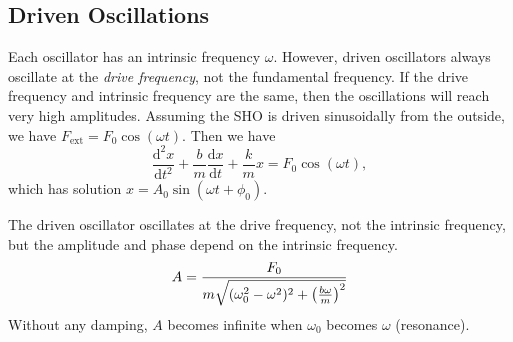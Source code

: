 \documentclass[class=article, crop=false]{standalone}
\begin{document}
  \subsection{Driven Oscillations}
  Each oscillator has an intrinsic frequency $\omega$. However, driven oscillators always oscillate at the \emph{drive frequency}, not the fundamental frequency. If the drive frequency and intrinsic frequency are the same, then the oscillations will reach very high amplitudes. Assuming the SHO is driven sinusoidally from the outside, we have $F_{\text{ext}} = F_0\cos(\omega t)$. Then we have
  \[
    \frac{\mathrm{d}^2x}{\mathrm{d}t^2}+ \frac{b}{m}\frac{\mathrm{d}x}{\mathrm{d}t}+\frac{k}{m}x = F_0\cos(\omega t),
  \]
  which has solution $x = A_0\sin(\omega t + \phi_0)$.
  \begin{note}{}
    The driven oscillator oscillates at the drive frequency, not the intrinsic frequency, but the amplitude and phase depend on the intrinsic frequency.
    \[
      A = \frac{F_0}{m \sqrt{(\omega_0^2-\omega^2)^2 + \left( \frac{b\omega}{m} \right)^2}}
    \]
    Without any damping, $A$ becomes infinite when $\omega_0$ becomes $\omega$ (resonance).
  \end{note}
\end{document}
